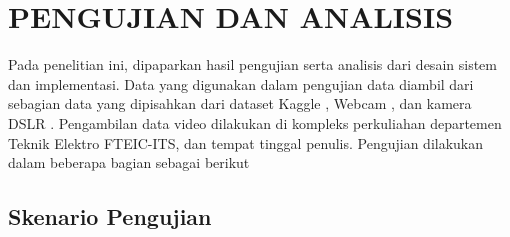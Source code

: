 \chapter{PENGUJIAN DAN ANALISIS}
\label{chap:pengujiananalisis}

Pada penelitian ini, dipaparkan hasil pengujian serta analisis dari desain sistem dan implementasi. Data yang digunakan dalam pengujian data diambil dari sebagian data yang dipisahkan dari dataset Kaggle \cite{cit:kaggledata}, Webcam \cite{cit:wb500}, dan kamera DSLR \cite{cit:100d}.  Pengambilan data video dilakukan di kompleks perkuliahan departemen Teknik Elektro FTEIC-ITS, dan tempat tinggal penulis. Pengujian dilakukan dalam beberapa bagian sebagai berikut

\section{Skenario Pengujian}
\label{sec:skenariopengujian}

